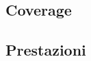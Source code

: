 \documentclass[%
]{beamer}
\begin{document}


        \subsection{Coverage}\label{subsec:coverage}
            \begin{frame}
                \frametitle{\insertsection}
                \framesubtitle{\insertsubsection}
                \centering
            \end{frame}

        \subsection{Prestazioni}\label{subsec:benchmark}
            \begin{frame}
                \frametitle{\insertsection}
                \framesubtitle{\insertsubsection}
                \centering
                
            \end{frame}
\end{document}
